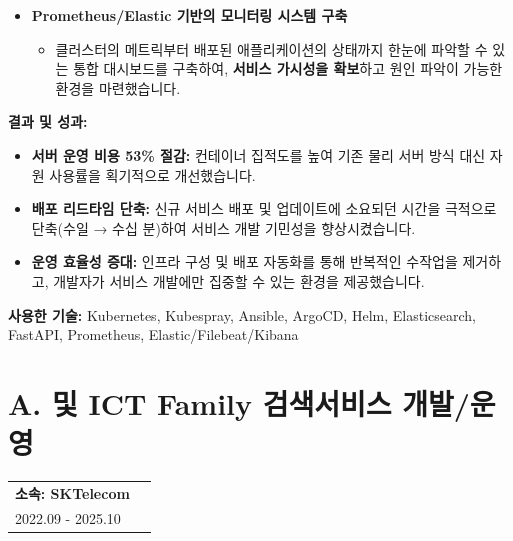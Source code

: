 \documentclass[letterpaper,11pt]{article}
\makeatletter
\newcommand{\resumeProject}[2]{
  \vspace{-1pt}\item
    \begin{tabular*}{0.97\textwidth}[t]{l@{\extracolsep{\fill}}r}
      \textbf{#1} \\
      \small{#2} \\
    \end{tabular*}\vspace{-5pt}
}
\makeatother
\begin{document}
{\begin{itemize}[leftmargin=*]
            \item \textbf{Prometheus/Elastic 기반의 모니터링 시스템 구축}
                \begin{itemize}[leftmargin=*, label=$\circ$]
                    \item 클러스터의 메트릭부터 배포된 애플리케이션의 상태까지 한눈에 파악할 수 있는 통합 대시보드를 구축하여, \textbf{서비스 가시성을 확보}하고 원인 파악이 가능한 환경을 마련했습니다.
                \end{itemize}
        \end{itemize}

        \textbf{결과 및 성과:}
        \begin{itemize}[leftmargin=*]
            \item \textbf{서버 운영 비용 53\% 절감:} 컨테이너 집적도를 높여 기존 물리 서버 방식 대신 자원 사용률을 획기적으로 개선했습니다.
            \item \textbf{배포 리드타임 단축:} 신규 서비스 배포 및 업데이트에 소요되던 시간을 극적으로 단축(수일 → 수십 분)하여 서비스 개발 기민성을 향상시켰습니다.
            \item \textbf{운영 효율성 증대:} 인프라 구성 및 배포 자동화를 통해 반복적인 수작업을 제거하고, 개발자가 서비스 개발에만 집중할 수 있는 환경을 제공했습니다.
        \end{itemize}

        \textbf{사용한 기술:} Kubernetes, Kubespray, Ansible, ArgoCD, Helm, Elasticsearch, FastAPI, Prometheus, Elastic/Filebeat/Kibana
      }
  \resumeProjectListEnd

\section{\textbf{A. 및 ICT Family 검색서비스 개발/운영}}
  \resumeProjectListStart
    \resumeProject
    {\textbf{소속}: SKTelecom} {2022.09 - 2025.10}
\end{document}
